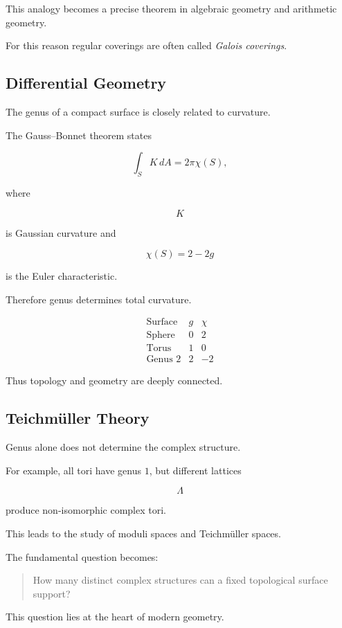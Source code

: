 \documentclass[12pt,a4paper]{article}
\theoremstyle{notespace}
\begin{document}
This analogy becomes a precise theorem in algebraic geometry and arithmetic geometry.

For this reason regular coverings are often called \emph{Galois coverings}.

\subsection{Differential Geometry}

The genus of a compact surface is closely related to curvature.

The Gauss--Bonnet theorem states

\[
\int_S K\,dA
=
2\pi\chi(S),
\]

where

\[
K
\]

is Gaussian curvature and

\[
\chi(S)=2-2g
\]

is the Euler characteristic.

Therefore genus determines total curvature.

\[
\begin{array}{c|c|c}
	\text{Surface} & g & \chi \\
	\hline
	\text{Sphere} & 0 & 2 \\
	\text{Torus} & 1 & 0 \\
	\text{Genus }2 & 2 & -2
\end{array}
\]

Thus topology and geometry are deeply connected.

\subsection{Teichmüller Theory}

Genus alone does not determine the complex structure.

For example, all tori have genus \(1\), but different lattices

\[
\Lambda
\]

produce non-isomorphic complex tori.

This leads to the study of moduli spaces and Teichmüller spaces.

The fundamental question becomes:

\begin{quote}
	How many distinct complex structures can a fixed topological surface support?
\end{quote}

This question lies at the heart of modern geometry.
\end{document}
